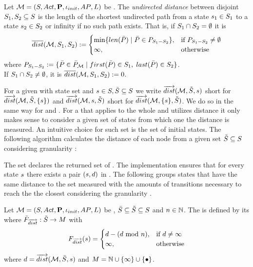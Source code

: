 \documentclass[preview]{standalone}
\begin{document}
\begin{definition}
	Let ${{{\mathcal{M}}}} = {{({S}, {Act}, {\textbf{P}}, {\iota_{init}}, {AP}, {L})}}$ be \achgphN. The \emph{undirected distance} between disjoint ${S}_1, {S}_2 \subseteq {S}$ is the length of the shortest undirected path from a state ${s}_1 \in {S}_1$ to a state ${s}_2 \in {S}_2$  or infinity if no such path exists. That is, if ${S}_1 \cap {S}_2 = \emptyset$ it is		
	\[
	{\overline{dist}}({{{\mathcal{M}}}}, {S}_1, {S}_2) := 
	\begin{cases}
		\min\{{len}({\bar{{P}}}) \mid {\bar{\ensuremath{{P}}}} \in P_{{S}_1 - {S}_2}\}, &\text{if } P_{{S}_1 - {S}_2} \neq \emptyset \\
		\infty, &\text{otherwise}
	\end{cases}
	\]
	where $P_{\states_1 - \states_2} := \{\pathbi \in \pathbiset \mid \pfirst(\pathbi) \in \states_1, \; \plast(\pathbi) \in \states_2\}$. \\
	\noindent
	If ${S}_1 \cap {S}_2 \neq \emptyset$, it is ${\overline{dist}}({{{\mathcal{M}}}}, {S}_1, {S}_2) := 0$.
\end{definition}

For a given \chgphN \chgph with state set \states and ${s} \in {S}, {\tilde{{S}}} \subseteq {S}$ we write ${\overrightarrow{dist}}({{\mathcal{M}}}, {\tilde{{S}}}, {s})$ short for ${\overrightarrow{dist}}({{\mathcal{M}}}, {\tilde{{S}}}, \{{s}\})$ and ${\overrightarrow{dist}}({{\mathcal{M}}}, {s}, {\tilde{{S}}})$ short for ${\overrightarrow{dist}}({{\mathcal{M}}}, \{{s}\}, {\tilde{{S}}})$. We do so in the same way for \distpathbi and \distpathrev.
For a \viewN that applies to the whole and utilizes distance it only makes sense to consider a given set of states from which one the distance is measured. An intuitive choice for such set is the set of initial states. The following algorithm calculates the distance of each node from a given set ${\tilde{{S}}} \subseteq {S}$ considering granularity \grandist:


The set \fctdistdefault declares the returned set of . The implementation ensures that for every state ${s}$ there exists a pair $({s}, {d})$ in \fctdistdefault. The following \viewN groups states that have the same distance to the set measured with the amounts of transitions necessary to reach the the closest \smstates considering the granularity \grandist.

\begin{definition}
		Let ${{{\mathcal{M}}}} = {{({S}, {Act}, {\textbf{P}}, {\iota_{init}}, {AP}, {L})}}$ be \achgphN, $\bar{{S}} \subseteq {\tilde{\ensuremath{{S}}}} \subseteq {S}$ and $n \in {\mathbb{N}}$. The \viewN \viewdistance is defined by its \grpfctN \gfctdistance where ${{\tilde{F}_{{{\overrightarrow{dist}}}}}} : {\tilde{{S}}} \to {\ensuremath{{M}}}$ with 
		\[
		{{F_{{{\overrightarrow{dist}}}}}}({s}) =
		\begin{cases}
			 {d} - ({d} \text{ mod } n), &\text{if } d \neq \infty \\
			 \infty, &\text{otherwise}
		\end{cases}		
		\]
		where ${d} = {\overrightarrow{dist}}({{{\mathcal{M}}}},\bar{{S}}, {s})$ and $\imggrp = \natnums \cup \{\infty\} \cup \remset$.
\end{definition}
\end{document}
